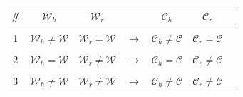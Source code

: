 \documentclass[conference]{IEEEtran}
\begin{document}
\begin{center}
\begin{tabular}{c | c c c c c c}
\hline
\# & $\mathcal{W}_h$                  & $\mathcal{W}_r$               &               & $\mathcal{C}_h$                  & $\mathcal{C}_r$ \\
\hline
\\
1 & $\mathcal{W}_h \neq \mathcal{W}$ & $\mathcal{W}_r = \mathcal{W}$ & $\rightarrow$ & $\mathcal{C}_h \neq \mathcal{C}$ & $\mathcal{C}_r = \mathcal{C}$  \\
\\
2 & $\mathcal{W}_h = \mathcal{W}$ & $\mathcal{W}_r \neq \mathcal{W}$ & $\rightarrow$ & $\mathcal{C}_h = \mathcal{C}$ & $\mathcal{C}_r \neq \mathcal{C}$  \\
\\
3 & $\mathcal{W}_h \neq \mathcal{W}$ & $\mathcal{W}_r \neq \mathcal{W}$ & $\rightarrow$ & $\mathcal{C}_h \neq \mathcal{C}$ & $\mathcal{C}_r \neq \mathcal{C}$   \\
\end{tabular}
\end{center} 
\end{document}
